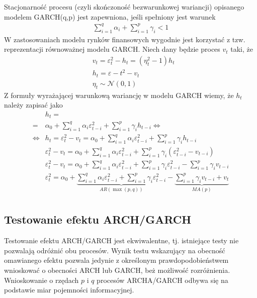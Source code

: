 Stacjonarność procesu (czyli skończoność bezwarunkowej wariancji) opisanego modelem GARCH(q,p) jest zapewniona, jeśli spełniony jest warunek
\begin{gather*}
\sum_{i=1}^{q}\alpha_i+\sum_{i=1}^{p}\gamma_i<1
\end{gather*}
W zastosowaniach modelu rynków finansowych wygodnie jest korzystać z tzw. reprezentacji równoważnej modelu GARCH. Niech dany będzie proces $ v_t $ taki, że
\begin{align*}
&v_t=\varepsilon_t^2-h_t=(\eta_t^2-1)h_t\\
&h_t=\varepsilon-t^2-v_t\\
&\eta_t\sim\mathcal N(0,1)
\end{align*}
Z formuły wyrażającej warunkową wariancję w modelu GARCH wiemy, że $ h_t $ należy zapisać jako
\begin{align*}
&h_t
=\\=&
\alpha_0+\sum_{i=1}^{q}\alpha_i\varepsilon_{t-i}^2+\sum_{i=1}^{p}\gamma_ih_{t-i}
\Leftrightarrow\\\Leftrightarrow&
h_t=\varepsilon_t^2-v_t=\alpha_0+\sum_{i=1}^{q}\alpha_i\varepsilon_{t-i}^2+\sum_{i=1}^{p}\gamma_ih_{t-i}\\&
\varepsilon_t^2-v_t=\alpha_0+\sum_{i=1}^{q}\alpha_i\varepsilon_{t-i}^2+\sum_{i=1}^{p}\gamma_i\left(\varepsilon_{t-i}^2-v_{t-i}\right)\\&
\varepsilon_t^2-v_t=\alpha_0+\sum_{i=1}^{q}\alpha_i\varepsilon_{t-i}^2+\sum_{i=1}^{p}\gamma_i\varepsilon_{t-i}^2-\sum_{i=1}^{p}\gamma_iv_{t-i}\\&
\varepsilon_t^2=\alpha_0+\underbrace{\sum_{i=1}^{q}\alpha_i\varepsilon_{t-i}^2+\sum_{i=1}^{p}\gamma_i\varepsilon_{t-i}^2}_{AR(\max(p,q))}-\underbrace{\sum_{i=1}^{p}\gamma_iv_{t-i}+v_t}_{MA(p)}\\&
\end{align*}
\subsection{Testowanie efektu ARCH/GARCH}
Testowanie efektu ARCH/GARCH jest ekwiwalentne, tj. istniejące testy nie pozwalają odróżnić obu procesów. Wynik testu wskazujący na obecność omawianego efektu pozwala jedynie z określonym prawdopodobieństwem wnioskować o obecności ARCH lub GARCH, beż możliwość rozróżnienia. Wnioskowanie o rzędach $ p $ i $ q $ procesów ARCHA/GARCH odbywa się na podstawie miar pojemności informacyjnej.
